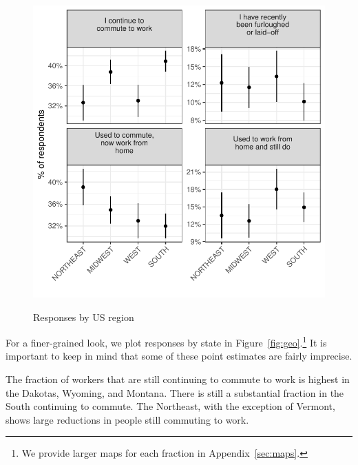\documentclass[12pt]{article}
\begin{document}
\begin{figure}
  \caption{Responses by US region} \label{fig:region}
\centering
\begin{minipage}{1.0 \linewidth}
  \includegraphics[width = \linewidth]{plots/region.pdf} \\
  \begin{footnotesize}
    \end{footnotesize}
\end{minipage}
\end{figure} 

For a finer-grained look, we plot responses by state in Figure~\ref{fig:geo}.\footnote{
  We provide larger maps for each fraction in Appendix~\ref{sec:maps}. 
}
It is important to keep in mind that some of these point estimates are fairly imprecise.

The fraction of workers that are still continuing to commute to work is highest in the Dakotas, Wyoming, and Montana.
There is still a substantial fraction in the South continuing to commute. 
The Northeast, with the exception of Vermont, shows large reductions in people still commuting to work. 
\end{document}
